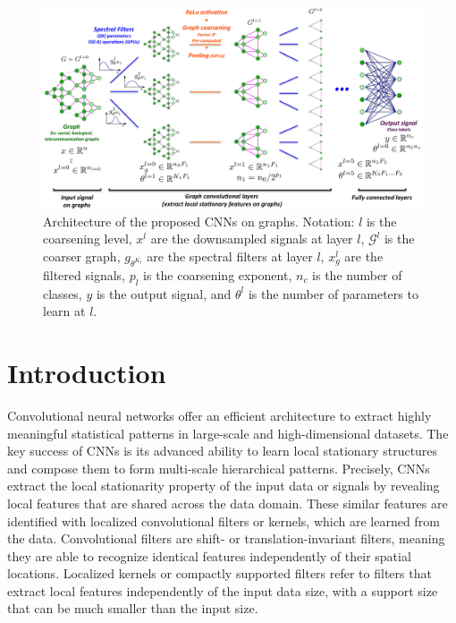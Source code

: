 \documentclass{article}
\newcommand{\G}{\mathcal{G}}
\begin{document}
\begin{figure}[h!]
\centering
\includegraphics[width=\textwidth]{images/illustrationCNNgraphs}
\caption{Architecture of the proposed CNNs on graphs. Notation: $l$ is the
coarsening level, $x^l$ are the downsampled signals at layer $l$, $\G^l$ is the coarser graph, $g_{\theta^{K_l}}$ are the spectral filters at layer $l$, $x_g^l$ are the filtered signals, $p_l$ is the coarsening exponent, $n_c$ is the number of classes, $y$ is the output signal, and $\theta^l$ is the number of parameters to learn at $l$.}
\label{fig_illustration}
\end{figure}

\section{Introduction}

Convolutional neural networks \cite{pro:LeCunBottouBengioHaffner98MNIST}
offer an efficient architecture to extract highly meaningful statistical
patterns in large-scale and high-dimensional datasets. The key success of CNNs
is its advanced ability to learn local stationary structures and compose them to
form multi-scale hierarchical patterns. Precisely, CNNs extract the local
stationarity property of the input data or signals by revealing local features
that are shared across the data domain. These similar features are identified
with localized convolutional filters or kernels, which are learned from the
data. Convolutional filters are shift- or translation-invariant filters, meaning
they are able to recognize identical features independently of their spatial
locations. Localized kernels or compactly supported filters refer to filters
that extract local features independently of the input data size, with a support
size that can be much smaller than the input size.
\end{document}
